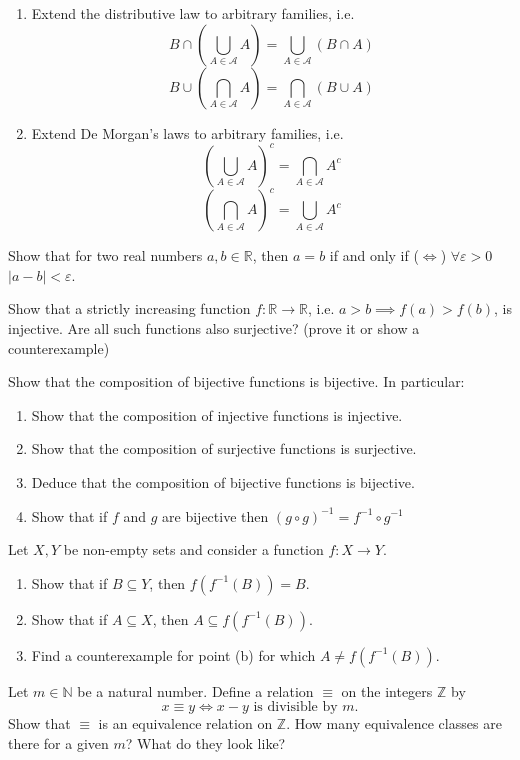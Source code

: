 \documentclass[11pt]{article}%
\begin{document}
\begin{Exercise}[title=**]
	\begin{enumerate}[label={\alph*)}]
		\item Extend the distributive law to arbitrary families, i.e.
		\[B\cap(\bigcup_{A\in\mathcal{A}}A) = \bigcup_{A\in\mathcal{A}}(B\cap A)\]
		\[B\cup(\bigcap_{A\in\mathcal{A}}A) = \bigcap_{A\in\mathcal{A}}(B\cup A)\]
		\item Extend De Morgan's laws to arbitrary families, i.e.
		\[(\bigcup_{A\in\mathcal{A}}A)^c = \bigcap_{A\in\mathcal{A}} A^c\]
		\[(\bigcap_{A\in\mathcal{A}}A)^c = \bigcup_{A\in\mathcal{A}} A^c\]
	\end{enumerate}
\end{Exercise}

\begin{Exercise}[title=*$\dagger$]
	Show that for two real numbers $a,b\in\mathbb R$, then $a=b$ if and only if ($\iff$) $\forall \varepsilon>0$ $|a-b|<\varepsilon$.
\end{Exercise}

\begin{Exercise}[title=**]
	Show that a strictly increasing function $f:\mathbb R \to \mathbb R$, i.e. $a>b \implies f(a)>f(b)$, is injective. Are all such functions also surjective? (prove it or show a counterexample)
\end{Exercise}

\begin{Exercise}[title=**$\dagger$]
	Show that the composition of bijective functions is bijective. In particular:
	\begin{enumerate}[label={\alph*)}]
		\item Show that the composition of injective functions is injective.
		\item Show that the composition of surjective functions is surjective.
		\item Deduce that the composition of bijective functions is bijective.
		\item Show that if $f$ and $g$ are bijective then $(g\circ g)^{-1}=f^{-1}\circ g^{-1}$
	\end{enumerate}
\end{Exercise}

\begin{Exercise}[title=**]
	Let $X,Y$ be non-empty sets and consider a function $f:X\to Y$.
	\begin{enumerate}[label={\alph*)}]
		\item Show that if $B\subseteq Y$, then $f(f^{-1}(B))=B$.
		\item Show that if $A\subseteq X$, then $A\subseteq f(f^{-1}(B))$.
		\item Find a counterexample for point (b) for which $A\neq f(f^{-1}(B))$.
	\end{enumerate}
\end{Exercise}

\begin{Exercise}[title=*]
	Let $m\in \mathbb N$ be a natural number. Define a relation $\equiv$ on the integers $\mathbb Z$ by
	\[x\equiv y\iff x-y\text{ is divisible by }m.\]
	Show that $\equiv$ is an equivalence relation on $\mathbb Z$. How many equivalence classes are there for a given $m$? What do they look like?
\end{Exercise}
\end{document}
